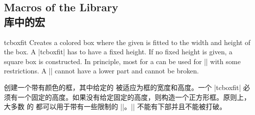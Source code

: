 
\subsection{Macros of the Library\\库中的宏}

\begin{docCommand}{tcboxfit}{}
Creates a colored box where the given  is fitted to
the width and height of the box. A |tcboxfit| has to have a fixed height.
If no fixed height is given, a square box is constructed.
In principle, most  for a 
can be used for |\tcboxfit| with some restrictions. A |\tcboxfit| cannot have
a lower part and cannot be broken.

创建一个带有颜色的框，其中给定的  被适应为框的宽度和高度。一个 |tcboxfit| 必须有一个固定的高度。如果没有给定固定的高度，则构造一个正方形框。原则上，大多数  的  都可以用于带有一些限制的 |\tcboxfit|。|\tcboxfit| 不能有下部并且不能被打破。
\begin{dispExample}
\begin{tcbraster}[raster columns=3,raster valign=bottom]
\end{tcbraster}
\end{dispExample}
\end{docCommand}
